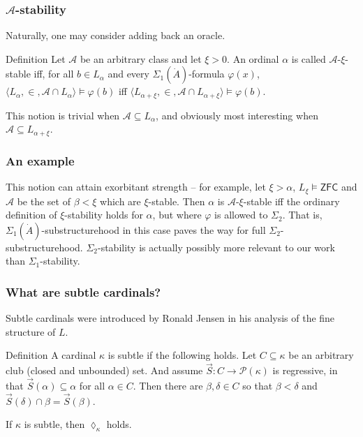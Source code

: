 \documentclass{beamer}
\newcommand{\ZFC}{\mathsf{ZFC}}
\begin{document}
\begin{frame}
\frametitle{$\mathcal{A}$-stability}
Naturally, one may consider adding back an oracle.

\begin{block}{Definition}
Let $\mathcal{A}$ be an arbitrary class and let $\xi > 0$. An ordinal $\alpha$ is called $\mathcal{A}$-$\xi$-stable iff, for all $b \in L_\alpha$ and every $\Sigma_1(\dot{A})$-formula $\varphi(x)$, $\langle L_\alpha, \in, \mathcal{A} \cap L_\alpha \rangle \models \varphi(b)$ iff $\langle L_{\alpha+\xi}, \in, \mathcal{A} \cap L_{\alpha+\xi} \rangle \models \varphi(b)$.
\end{block}

\pause

This notion is trivial when $\mathcal{A} \subseteq L_\alpha$, and obviously most interesting when $\mathcal{A} \subseteq L_{\alpha+\xi}$.
\end{frame}

\begin{frame}
\frametitle{An example}
This notion can attain exorbitant strength -- for example, let $\xi > \alpha$, $L_\xi \models \ZFC$ and $\mathcal{A}$ be the set of $\beta < \xi$ which are $\xi$-stable. \pause Then $\alpha$ is $\mathcal{A}$-$\xi$-stable iff the ordinary definition of $\xi$-stability holds for $\alpha$, but where $\varphi$ is allowed to $\Sigma_2$. That is, $\Sigma_1(\dot{A})$-substructurehood in this case paves the way for full $\Sigma_2$-substructurehood. $\Sigma_2$-stability is actually possibly more relevant to our work than $\Sigma_1$-stability.
\end{frame}

\begin{frame}
\frametitle{What are subtle cardinals?}
Subtle cardinals were introduced by Ronald Jensen in his analysis of the fine structure of $L$.

\begin{block}{Definition}
A cardinal $\kappa$ is subtle if the following holds. Let $C \subseteq \kappa$ be an arbitrary club (closed and unbounded) set. And assume $\vec{S}: C \to \mathcal{P}(\kappa)$ is regressive, in that $\vec{S}(\alpha) \subseteq \alpha$ for all $\alpha \in C$. Then there are $\beta, \delta \in C$ so that $\beta < \delta$ and $\vec{S}(\delta) \cap \beta = \vec{S}(\beta)$.
\end{block}

If $\kappa$ is subtle, then $\lozenge_\kappa$ holds.
\end{frame}
\end{document}
